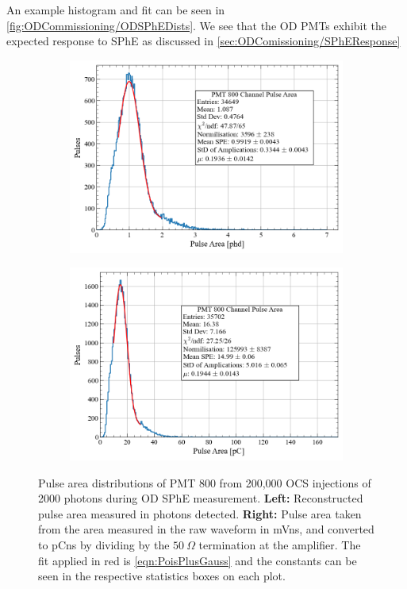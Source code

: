 An example histogram and fit can be seen in \autoref{fig:ODCommissioning/ODSPhEDists}. We see that the OD PMTs exhibit the expected response to SPhE as discussed in \autoref{sec:ODComissioning/SPhEResponse}

\begin{figure}
     \centering
     \begin{subfigure}[b]{0.47\textwidth}
         \centering
         \includegraphics[width=\textwidth]{figures/ODCommissioning/PMT800_PulseArea_Distribution.png}
         \caption{}
         \label{fig:ODCommissioning/ODSPhE_phd}
     \end{subfigure}
     \begin{subfigure}[b]{0.47\textwidth}
         \centering
         \includegraphics[width=\textwidth]{figures/ODCommissioning/PMT800_PulseArea_Distribution_pC.png}
         \caption{}
         \label{fig:ODCommissioning/ODSPhE_pC}
     \end{subfigure}
        \caption{Pulse area distributions of PMT 800 from 200,000 OCS injections of 2000 photons during OD SPhE measurement. \textbf{Left:} Reconstructed pulse area measured in photons detected. \textbf{Right:} Pulse area taken from the area measured in the raw waveform in mVns, and converted to pCns by dividing by the $50~\Omega$ termination at the amplifier. The fit applied in red is \autoref{eqn:PoisPlusGauss} and the constants can be seen in the respective statistics boxes on each plot.}
        \label{fig:ODCommissioning/ODSPhEDists}
\end{figure}
